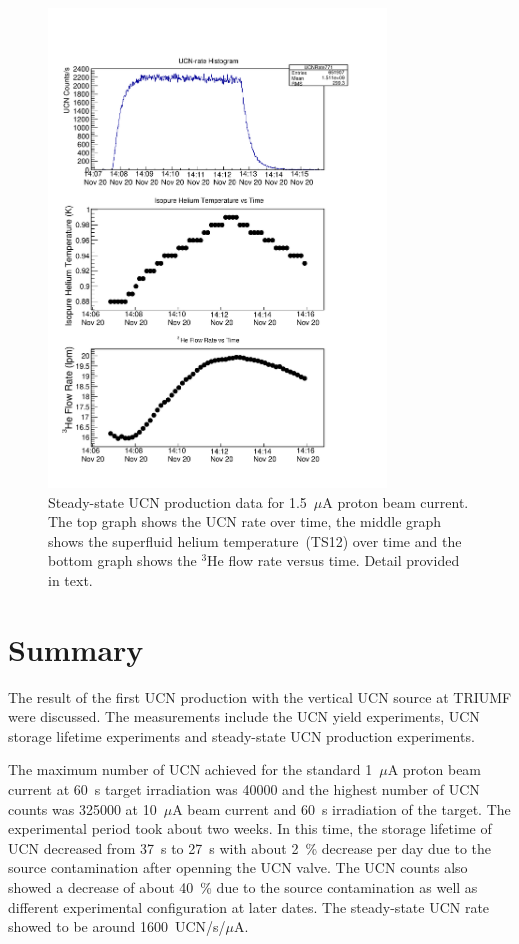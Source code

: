 \begin{figure}[h!]
  \centering \includegraphics[width=0.8\textwidth]{problemrun.pdf}
  \caption{Steady-state UCN production data for 1.5~$\mu$A proton beam
    current. The top graph shows the UCN rate over time, the middle
    graph shows the superfluid helium temperature~(TS12) over time and
    the bottom graph shows the $^3$He flow rate versus time. Detail
    provided in text.}
\label{fig:problemrun}
\end{figure}


\section{Summary}

The result of the first UCN production with the vertical UCN source at
TRIUMF were discussed. The measurements include the UCN yield
experiments, UCN storage lifetime experiments and steady-state UCN
production experiments.

The maximum number of UCN achieved for the standard 1~$\mu$A proton
beam current at 60~s target irradiation was 40000 and the highest
number of UCN counts was 325000 at 10~$\mu$A beam current and 60~s
irradiation of the target.  The experimental period took about two
weeks. In this time, the storage lifetime of UCN decreased from 37~s
to 27~s with about 2~\% decrease per day due to the source
contamination after openning the UCN valve. The UCN counts also showed
a decrease of about 40~\% due to the source contamination as well as
different experimental configuration at later dates. The steady-state
UCN rate showed to be around 1600~UCN/s/$\mu$A.

